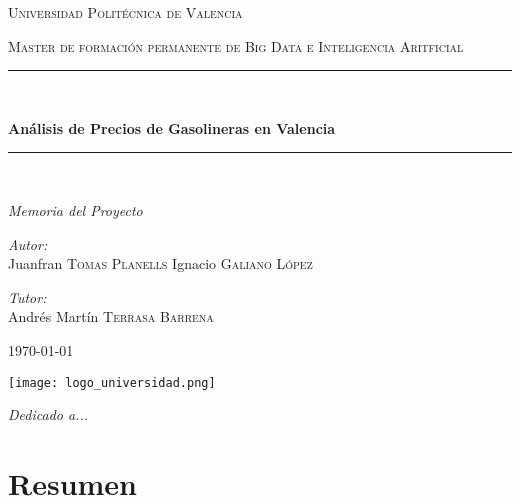\begin{titlepage}
  \centering
  \vspace*{2cm}

  {\scshape\LARGE Universidad Politécnica de Valencia \par}
  \vspace{1cm}
  {\scshape\Large Master de formación permanente de Big Data e Inteligencia Aritficial\par}
  \vspace{1.5cm}

  \rule{\linewidth}{0.5mm} \\[0.4cm]
  {\huge\bfseries Análisis de Precios de Gasolineras en Valencia\par}
  \rule{\linewidth}{0.5mm} \\[1cm]

  {\Large\itshape Memoria del Proyecto\par}
  \vfill

  \begin{minipage}[t]{0.2\textwidth}
    \begin{flushleft} \large
      \emph{Autor:}\\
      Juanfran \textsc{Tomas Planells}
      Ignacio \textsc{Galiano López}
    \end{flushleft}
  \end{minipage}
  \begin{minipage}[t]{0.2\textwidth}
    \begin{flushright} \large
      \emph{Tutor:} \\
      Andrés Martín \textsc{Terrasa Barrena}
    \end{flushright}
  \end{minipage}
  \vfill

  {\large \today\par}

  \vspace{1cm}
  \texttt{[image: logo\_universidad.png]}

\end{titlepage}

\cleardoublepage
\thispagestyle{empty}
\vspace*{\fill}
\begin{center}
  \textit{Dedicado a...}
\end{center}
\vspace*{\fill}

\cleardoublepage
\chapter*{Resumen}

